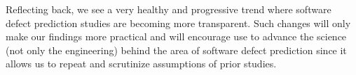 Reflecting back, we see a very healthy and progressive trend where software defect prediction studies are becoming more transparent. Such changes will only make our findings more practical and will encourage use to advance the science (not only the engineering) behind the area of software defect prediction since it allows us to repeat and scrutinize assumptions of prior studies.




